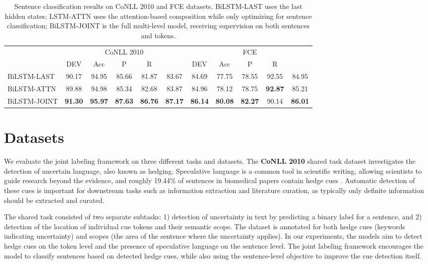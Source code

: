 \documentclass[letterpaper]{article} \usepackage{aaai19}  \usepackage{times}  \usepackage{helvet}  \usepackage{courier}  \usepackage{graphicx}
\renewcommand\cite{\citep}	\newcommand\newcite{\citet}
\begin{document}
\begin{table*}[t]
\centering
\setlength\tabcolsep{9pt}
\begin{tabular}{l|ccccc|ccccc} \toprule
 & \multicolumn{5}{c|}{{\small CoNLL 2010}} & \multicolumn{5}{c}{{\small FCE}} \\
  & {\small DEV } & {\small Acc} & {\small P} & {\small R} & {\small } & {\small DEV } & {\small Acc} & {\small P} & {\small R} & {\small } \\ \midrule
{\small BiLSTM-LAST} & 90.17 & 94.95 & 85.66 & 81.87 & 83.67 & 84.69 & 77.75 & 78.55 & 92.55 & 84.95 \\ 
{\small BiLSTM-ATTN} & 89.88 & 94.98 & 85.34 & 82.68 & 83.87 & 84.96 & 78.12 & 78.75 & \textbf{92.87} & 85.21 \\
{\small BiLSTM-JOINT} & \textbf{91.30} & \textbf{95.97} & \textbf{87.63} & \textbf{86.76} & \textbf{87.17} & \textbf{86.14} & \textbf{80.08} & \textbf{82.27} & 90.14 & \textbf{86.01} \\ \bottomrule
\end{tabular}
\caption{
Sentence classification results on CoNLL 2010 and FCE datasets. {\small BiLSTM-LAST} uses the last hidden states; {\small LSTM-ATTN} uses the attention-based composition while only optimizing for sentence classification; {\small BiLSTM-JOINT} is the full multi-level model, receiving supervision on both sentences and tokens.
}
\label{tab:results1}
\end{table*}






\section{Datasets}




We evaluate the joint labeling framework on three different tasks and datasets.
The \textbf{CoNLL 2010} shared task \cite{Farkas2010} dataset investigates the detection of uncertain language, also known as hedging. Speculative language is a common tool in scientific writing, allowing scientists to guide research beyond the evidence, and roughly 19.44\% of sentences in  biomedical papers contain hedge cues \cite{Vincze2008}.
Automatic detection of these cues is important for downstream tasks such as information extraction and literature curation, as typically only definite information should be extracted and curated.

The shared task consisted of two separate subtasks: 1) detection of uncertainty in text by predicting a binary label for a sentence, and 2) detection of the location of individual cue tokens and their semantic scope.
The dataset is annotated for both hedge cues (keywords indicating uncertainty) and scopes (the area of the sentence where the uncertainty applies). In our experiments, the models aim to detect hedge cues on the token level and the presence of speculative language on the sentence level. The joint labeling framework encourages the model to classify sentences based on detected hedge cues, while also using the sentence-level objective to improve the cue detection itself.
\end{document}
